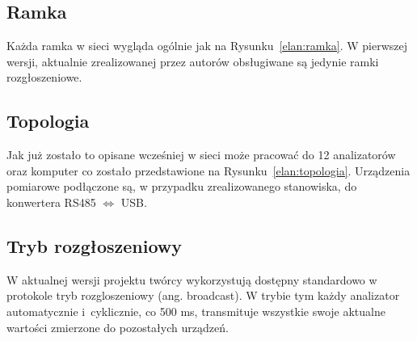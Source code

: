 
\subsection{Ramka}
Każda ramka w sieci  wygląda ogólnie jak na Rysunku~\ref{elan:ramka}. W pierwszej wersji, aktualnie zrealizowanej przez autorów obsługiwane są jedynie ramki rozgłoszeniowe.

\subsection{Topologia}
Jak już zostało to opisane wcześniej w sieci może pracować do 12 analizatorów oraz komputer co zostało przedstawione na Rysunku~\ref{elan:topologia}. Urządzenia pomiarowe podłączone są, w przypadku zrealizowanego stanowiska, do konwertera RS485 $\Leftrightarrow$ USB.

\subsection{Tryb rozgłoszeniowy}
W aktualnej wersji projektu twórcy wykorzystują dostępny standardowo w protokole tryb rozgloszeniowy (ang. broadcast). W trybie tym każdy analizator automatycznie i~cyklicznie, co 500 ms, transmituje wszystkie swoje aktualne wartości zmierzone do pozostałych urządzeń.